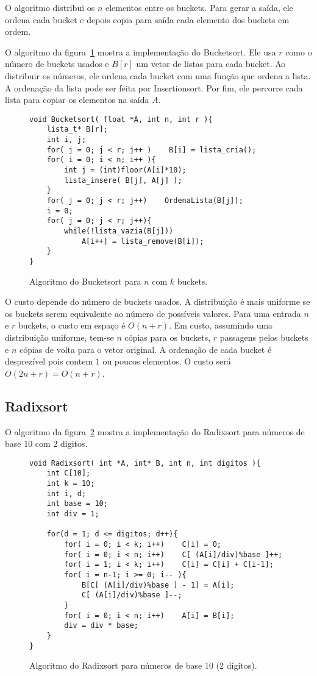 O algoritmo distribui os $n$ elementos entre os buckets.
Para gerar a saída, ele ordena cada bucket e depois copia para saída 
cada elemento dos buckets em ordem.

O algoritmo da figura~\ref{aula03:algo:bucket} mostra a implementação do
Bucketsort.
Ele usa $r$ como o número de buckets usados e $B[r]$ um vetor de listas para
cada bucket.
Ao distribuir os números, ele ordena cada bucket com uma função
que ordena a lista. A ordenação da lista pode ser feita por
Insertionsort.
Por fim, ele percorre cada lista para copiar os elementos na saída $A$.
%
\begin{figure}[!htb]
\centering
\begin{framed}
\begin{lstlisting}
void Bucketsort( float *A, int n, int r ){
	lista_t* B[r];
	int i, j;
	for( j = 0; j < r; j++ )    B[i] = lista_cria();
	for( i = 0; i < n; i++ ){
		int j = (int)floor(A[i]*10);
		lista_insere( B[j], A[j] );
	}
	for( j = 0; j < r; j++)    OrdenaLista(B[j]);
	i = 0;
	for( j = 0; j < r; j++){
		while(!lista_vazia(B[j]))
			A[i++] = lista_remove(B[i]);
	}
}
\end{lstlisting}
\end{framed}
\caption{Algoritmo do Bucketsort para $n$ com $k$ buckets.}
\label{aula03:algo:bucket}
\end{figure}

O custo depende do número de buckets usados. 
A distribuição é mais uniforme se os buckets serem equivalente ao número de possíveis valores.
Para uma entrada $n$ e $r$ buckets, o custo em espaço é $O(n+r)$.
Em custo, assumindo uma distribuição uniforme, tem-se $n$ cópias para os buckets, $r$ passagens pelos buckets e
$n$ cópias de volta para o vetor original.
A ordenação de cada bucket é desprezível pois contem $1$ ou poucos elementos.
O custo será $O(2n+r) = O(n+r)$.

\subsection{Radixsort}

O algoritmo da figura~\ref{aula03:algo:radix} mostra a implementação do Radixsort
para números de base 10 com 2 dígitos.
%
\begin{figure}[!htb]
\centering
\begin{framed}
\begin{lstlisting}
void Radixsort( int *A, int* B, int n, int digitos ){
	int C[10];
	int k = 10;
	int i, d;
	int base = 10;
	int div = 1;

	for(d = 1; d <= digitos; d++){
		for( i = 0; i < k; i++)    C[i] = 0;
		for( i = 0; i < n; i++)    C[ (A[i]/div)%base ]++;
		for( i = 1; i < k; i++)    C[i] = C[i] + C[i-1];
		for( i = n-1; i >= 0; i-- ){
			B[C[ (A[i]/div)%base ] - 1] = A[i];
			C[ (A[i]/div)%base ]--;
		}
		for( i = 0; i < n; i++)    A[i] = B[i];
		div = div * base;
	}
}
\end{lstlisting}
\end{framed}
\caption{Algoritmo do Radixsort para números de base 10 (2 dígitos).}
\label{aula03:algo:radix}
\end{figure}

